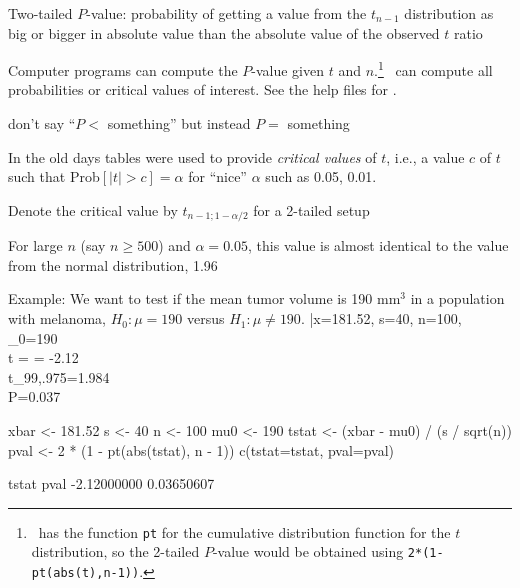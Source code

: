 \item Two-tailed $P$-value: probability of getting a value from the
  $t_{n-1}$ distribution as big or bigger in absolute value than the
  absolute value of the observed $t$ ratio
\item Computer programs can compute the $P$-value given $t$ and
  $n$.\footnote{\R\ has the function \texttt{pt} for the cumulative
    distribution function for the $t$ distribution, so the 2-tailed
    $P$-value would be obtained using 
    \texttt{2*(1-pt(abs(t),n-1))}.}
  \R\ can compute all probabilities or critical
  values of interest.  See the help files for .
 \bi
 \item don't say ``$P <$ something'' but instead $P=$ something
 \ei
\item In the old days tables were used to provide \emph{critical
    values} of $t$, i.e., a value $c$ of $t$ such that Prob$[|t| > c]
  = \alpha$ for ``nice'' $\alpha$ such as 0.05, 0.01.
\item Denote the critical value by $t_{n-1;1-\alpha/2}$ for a 2-tailed setup
\item For large $n$ (say $n \geq 500$) and $\alpha=0.05$, this value is almost identical to
  the value from the normal distribution, 1.96
\item Example:  We want to test if the mean tumor volume is 190 mm$^3$ in a population with melanoma, $H_0: \mu = 190$ versus $H_1: \mu \neq 190$.
\beqa
\bar{x}=181.52, s=40, n=100, \mu_{0}=190 \\
t =  = -2.12 \\
t_{99,.975}=1.984 \rightarrow {} \\
P=0.037
\eeqa
\ei
\begin{Schunk}
\begin{Sinput}
xbar  <- 181.52
s     <- 40
n     <- 100
mu0   <- 190
tstat <- (xbar - mu0) / (s / sqrt(n))
pval  <- 2 * (1 - pt(abs(tstat), n - 1))
c(tstat=tstat, pval=pval)
\end{Sinput}
\begin{Soutput}
      tstat        pval 
-2.12000000  0.03650607 
\end{Soutput}
\end{Schunk}


